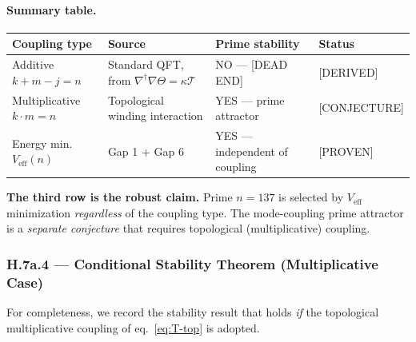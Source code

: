 \paragraph{Summary table.}

\begin{center}
\begin{tabular}{p{3.8cm}p{3.5cm}p{3.5cm}p{2.5cm}}
\hline
\textbf{Coupling type} & \textbf{Source} & \textbf{Prime stability} & \textbf{Status} \\
\hline
Additive $k{+}m{-}j = n$ & Standard QFT, from $\nabla^\dagger\nabla\Theta{=}\kappa\mathcal{T}$ & NO — [DEAD END] & [DERIVED] \\
Multiplicative $k{\cdot}m{=}n$ & Topological winding interaction & YES — prime attractor & [CONJECTURE] \\
Energy min.\ $V_{\mathrm{eff}}(n)$ & Gap 1 + Gap 6 & YES — independent of coupling & [PROVEN] \\
\hline
\end{tabular}
\end{center}

\textbf{The third row is the robust claim.}  Prime $n = 137$ is selected by
$V_{\mathrm{eff}}$ minimization \emph{regardless} of the coupling type.
The mode-coupling prime attractor is a \emph{separate conjecture} that requires
topological (multiplicative) coupling.

\subsubsection*{H.7a.4 — Conditional Stability Theorem (Multiplicative Case)}
\label{sec:H7a-conditional}

For completeness, we record the stability result that holds \emph{if} the
topological multiplicative coupling of eq.~\eqref{eq:T-top} is adopted.

\bigskip

